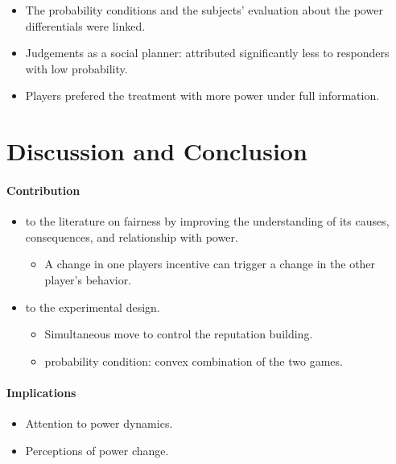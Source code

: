 \documentclass[../root]{subfiles}
\begin{document}
    \begin{itemize}
      \item The probability conditions and the subjects' evaluation about the power differentials were linked.
      \item Judgements as a social planner: attributed significantly less to responders with low probability.
      \item Players prefered the treatment with more power under full information.
    \end{itemize}

    \section{Discussion and Conclusion}

    \paragraph{Contribution}

    \begin{itemize}
      \item to the literature on fairness by improving the understanding of its causes, consequences, and relationship with power.
      \begin{itemize}
        \item A change in one players incentive can trigger a change in the other player's behavior.
      \end{itemize}
      \item to the experimental design.
      \begin{itemize}
        \item Simultaneous move to control the reputation building.
        \item probability condition: convex combination of the two games.
      \end{itemize}
    \end{itemize}

    \paragraph{Implications}

    \begin{itemize}
      \item Attention to power dynamics.
      \item Perceptions of power change.
    \end{itemize}
\end{document}
